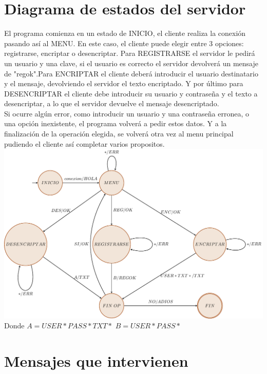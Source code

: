 \documentclass[11pt]{article}
\begin{document}
\section{Diagrama de estados del servidor}
El programa comienza en un estado de INICIO, el cliente realiza la conexi\'on pasando as\'i al MENU. En este caso, el cliente puede elegir entre 3 opciones: registrarse, encriptar o desencriptar. Para REGISTRARSE el servidor le pedir\'a un usuario y una clave, si el usuario es correcto el servidor devolver\'a un mensaje de "regok".Para ENCRIPTAR el cliente deber\'a introducir el usuario destinatario y el mensaje, devolviendo el servidor el texto encriptado. Y por \'ultimo para DESENCRIPTAR el cliente debe introducir su usuario y contraseña y el texto a desencriptar, a lo que el servidor devuelve el mensaje desencriptado.
 \\Si ocurre alg\'un error, como introducir un usuario y una contraseña erronea, o una opci\'on inexistente, el programa volver\'a a pedir estos datos. Y a la finalizaci\'on de la operaci\'on elegida, se volver\'a otra vez al menu principal pudiendo el cliente así completar varios propositos.
\\

\includegraphics[width=15cm]{../pdf/diagrama.pdf}
	Donde $A=USER*PASS*TXT*$ \quad $B=USER*PASS*$ 
\newpage

\section{Mensajes que intervienen}
\end{document}
